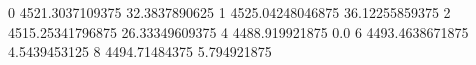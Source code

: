 0 4521.3037109375 32.3837890625
1 4525.04248046875 36.12255859375
2 4515.25341796875 26.33349609375
4 4488.919921875 0.0
6 4493.4638671875 4.5439453125
8 4494.71484375 5.794921875
